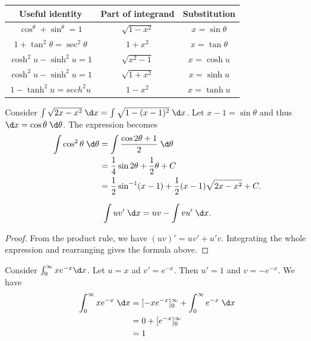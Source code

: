 \documentclass[a4paper]{article}
\begin{document}
  \vspace{4pt}
  \noindent
  \begin{tabular}{ccc}
    \toprule
    Useful identity                   & Part of integrand & Substitution      \\
    \midrule
    $\cos^\theta + \sin^\theta = 1$   & $\sqrt{1 - x^2}$  & $x = \sin \theta$ \\
    $1 + \tan^2\theta = \sec^2\theta$ & $1 + x^2$         & $x = \tan\theta$  \\
    $\cosh^2u - \sinh^2 u = 1$        & $\sqrt{x^2 - 1}$  & $x=\cosh u$       \\
    $\cosh^2u - \sinh^2 u = 1$        & $\sqrt{1 + x^2}$  & $x=\sinh u$       \\
    $1 - \tanh^2 u = sech^2u$         & $1 - x^2$         & $x = \tanh u$     \\
    \bottomrule
  \end{tabular}

  \begin{eg}
    Consider $\int \sqrt{2x - x^2}\;\d x = \int\sqrt{1 - (x - 1)^2}\;\d x$. Let $x - 1=\sin\theta$ and thus $\d x = \cos \theta\;\d\theta$. The expression becomes
    \begin{align*}
      \int \cos^2\theta \;\d \theta &= \int\frac{\cos 2\theta + 1}{2}\;\d \theta\\
      &= \frac{1}{4}\sin 2\theta + \frac{1}{2}\theta + C\\
      &= \frac{1}{2}\sin^{-1}(x - 1) + \frac{1}{2}(x - 1)\sqrt{2x - x^2} + C.
    \end{align*}
  \end{eg}

  \begin{thm}
    \[
      \int uv'\;\d x = uv - \int vu' \;\d x.
    \]
  \end{thm}

  \begin{proof}
    From the product rule, we have $(uv)' = uv' + u'v$. Integrating the whole expression and rearranging gives the formula above.
  \end{proof}

  \begin{eg}
    Consider $\int_0^\infty xe^{-x}\d x$. Let $u = x$ ad $v' = e^{-x}$. Then $u' = 1$ and $v = -e^{-x}$. We have
    \begin{align*}
      \int_0^\infty xe^{-x}\;\d x &= [-xe^{-x}]^\infty_0 + \int_0^\infty e^{-x} \;\d x\\
      &= 0 + [e^{-x}]_0^\infty\\
      &= 1
    \end{align*}
  \end{eg}
\end{document}
